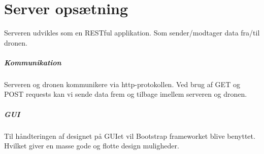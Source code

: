 \section{Server opsætning}
Serveren udvikles som en RESTful applikation. Som sender/modtager data fra/til dronen.

\subparagraph*{Kommunikation}
Serveren og dronen kommunikere via http-protokollen. Ved brug af GET og POST requests kan vi sende data frem og tilbage imellem serveren og dronen.

\subparagraph*{GUI}
Til håndteringen af designet på GUIet vil Bootstrap frameworket blive benyttet. Hvilket giver en masse gode og flotte design muligheder. 

